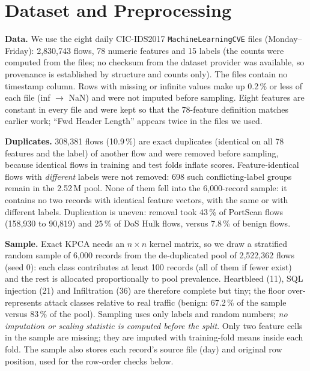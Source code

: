 \documentclass{ieeeaccess}
\newcommand{\tabsize}{\footnotesize}
\begin{document}
\section{Dataset and Preprocessing}\label{sec:data}
\textbf{Data.} We use the eight daily CIC-IDS2017 \texttt{MachineLearningCVE} files (Monday--Friday): 2{,}830{,}743 flows, 78 numeric features and 15 labels (the counts were computed from the files; no checksum from the dataset provider was available, so provenance is established by structure and counts only). The files contain no timestamp column. Rows with missing or infinite values make up 0.2\,\% or less of each file (inf $\to$ NaN) and were not imputed before sampling. Eight features are constant in every file and were kept so that the 78-feature definition matches earlier work; ``Fwd Header Length'' appears twice in the files we used.

\textbf{Duplicates.} 308{,}381 flows (10.9\,\%) are exact duplicates (identical on all 78 features and the label) of another flow and were removed before sampling, because identical flows in training and test folds inflate scores. Feature-identical flows with \emph{different} labels were not removed: 698 such conflicting-label groups remain in the 2.52\,M pool. None of them fell into the 6{,}000-record sample: it contains no two records with identical feature vectors, with the same or with different labels. Duplication is uneven: removal took 43\,\% of PortScan flows (158{,}930 to 90{,}819) and 25\,\% of DoS Hulk flows, versus 7.8\,\% of benign flows.

\textbf{Sample.} Exact KPCA needs an $n\times n$ kernel matrix, so we draw a stratified random sample of 6{,}000 records from the de-duplicated pool of 2{,}522{,}362 flows (seed 0): each class contributes at least 100 records (all of them if fewer exist) and the rest is allocated proportionally to pool prevalence. Heartbleed (11), SQL injection (21) and Infiltration (36) are therefore complete but tiny; the floor over-represents attack classes relative to real traffic (benign: 67.2\,\% of the sample versus 83\,\% of the pool). Sampling uses only labels and random numbers; \emph{no imputation or scaling statistic is computed before the split}. Only two feature cells in the sample are missing; they are imputed with training-fold means inside each fold. The sample also stores each record's source file (day) and original row position, used for the row-order checks below.

\begin{table}[t]
\caption{Class distribution of the 6{,}000-record sample.}\label{tab:classes}
\centering\tabsize

\end{table}
\end{document}
